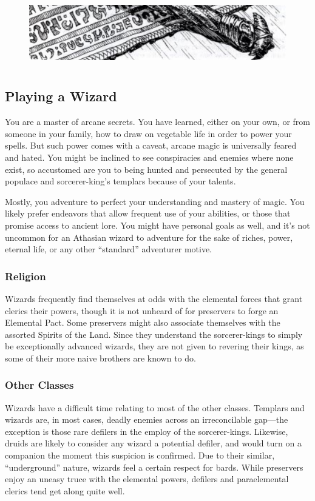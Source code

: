 \begin{figure}[b!]
\centering
\includegraphics[height=3cm]{images/filler-2.png}
\end{figure}

\subsection{Playing a Wizard}
You are a master of arcane secrets. You have learned, either on your own, or from someone in your family, how to draw on vegetable life in order to power your spells. But such power comes with a caveat, arcane magic is universally feared and hated. You might be inclined to see conspiracies and enemies where none exist, so accustomed are you to being hunted and persecuted by the general populace and sorcerer-king's templars because of your talents.

Mostly, you adventure to perfect your understanding and mastery of magic. You likely prefer endeavors that allow frequent use of your abilities, or those that promise access to ancient lore. You might have personal goals as well, and it's not uncommon for an Athasian wizard to adventure for the sake of riches, power, eternal life, or any other ``standard'' adventurer motive.

\subsubsection{Religion}
Wizards frequently find themselves at odds with the elemental forces that grant clerics their powers, though it is not unheard of for preservers to forge an Elemental Pact. Some preservers might also associate themselves with the assorted Spirits of the Land. Since they understand the sorcerer-kings to simply be exceptionally advanced wizards, they are not given to revering their kings, as some of their more naive brothers are known to do.

\subsubsection{Other Classes}
Wizards have a difficult time relating to most of the other classes. Templars and wizards are, in most cases, deadly enemies across an irreconcilable gap---the exception is those rare defilers in the employ of the sorcerer-kings. Likewise, druids are likely to consider any wizard a potential defiler, and would turn on a companion the moment this suspicion is confirmed. Due to their similar, ``underground'' nature, wizards feel a certain respect for bards. While preservers enjoy an uneasy truce with the elemental powers, defilers and paraelemental clerics tend get along quite well.

